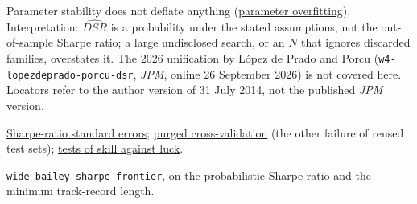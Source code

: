 \begin{qfmethod}
 Parameter stability does not deflate anything (\hyperref[pit:parameter-overfitting]{parameter overfitting}). Interpretation: $\widehat{DSR}$ is a probability under the stated assumptions, not the out-of-sample Sharpe ratio; a large undisclosed search, or an $N$ that ignores discarded families, overstates it. The 2026 unification by López de Prado and Porcu (\nolinkurl{w4-lopezdeprado-porcu-dsr}, \emph{JPM}, online 26 September 2026) is not covered here. Locators refer to the author version of 31 July 2014, not the published \emph{JPM} version.

 \hyperref[meth:sharpe-ratio-standard-error]{Sharpe-ratio standard errors}; \hyperref[meth:purged-embargoed-cross-validation]{purged cross-validation} (the other failure of reused test sets); \hyperref[meth:skill-luck-significance-tests]{tests of skill against luck}.

 \nolinkurl{wide-bailey-sharpe-frontier}, on the probabilistic Sharpe ratio and the minimum track-record length.

\end{qfmethod}

